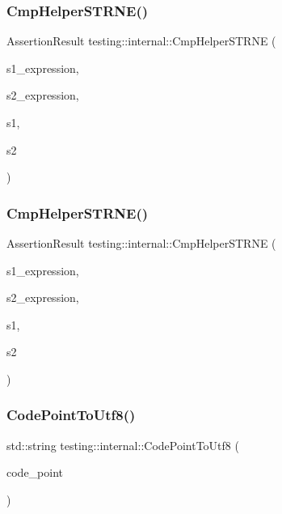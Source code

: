 \subsubsection{\texorpdfstring{CmpHelperSTRNE()}{CmpHelperSTRNE()}\hspace{0.1cm}{\footnotesize\ttfamily [1/2]}}
{\footnotesize\ttfamily Assertion\+Result testing\+::internal\+::\+Cmp\+Helper\+S\+T\+R\+NE (\begin{DoxyParamCaption}\item[{const char $\ast$}]{s1\+\_\+expression,  }\item[{const char $\ast$}]{s2\+\_\+expression,  }\item[{const char $\ast$}]{s1,  }\item[{const char $\ast$}]{s2 }\end{DoxyParamCaption})}

\mbox{\label{namespacetesting_1_1internal_a415a953647bbc9469f062dc966061efb}} 
\subsubsection{\texorpdfstring{CmpHelperSTRNE()}{CmpHelperSTRNE()}\hspace{0.1cm}{\footnotesize\ttfamily [2/2]}}
{\footnotesize\ttfamily Assertion\+Result testing\+::internal\+::\+Cmp\+Helper\+S\+T\+R\+NE (\begin{DoxyParamCaption}\item[{const char $\ast$}]{s1\+\_\+expression,  }\item[{const char $\ast$}]{s2\+\_\+expression,  }\item[{const wchar\+\_\+t $\ast$}]{s1,  }\item[{const wchar\+\_\+t $\ast$}]{s2 }\end{DoxyParamCaption})}

\mbox{\label{namespacetesting_1_1internal_a0c0f9558efb9abb965851c4738cdc725}} 
\subsubsection{\texorpdfstring{CodePointToUtf8()}{CodePointToUtf8()}}
{\footnotesize\ttfamily std\+::string testing\+::internal\+::\+Code\+Point\+To\+Utf8 (\begin{DoxyParamCaption}\item[{\mbox{\hyperlink{namespacetesting_1_1internal_a436defbb8e92c8e94e33ebcc86f278ba}{U\+Int32}}}]{code\+\_\+point }\end{DoxyParamCaption})}

